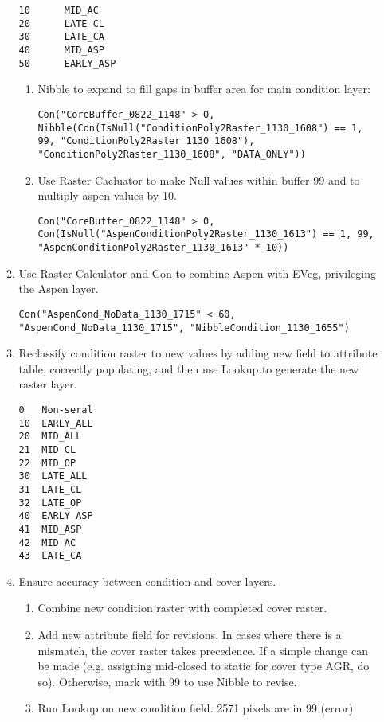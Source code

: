 \begin{enumerate}
\begin{enumerate}
\begin{verbatim}
10      MID_AC
20      LATE_CL
30      LATE_CA
40      MID_ASP
50      EARLY_ASP
        \end{verbatim}
        \begin{enumerate}
            \item Nibble to expand to fill gaps in buffer area for main condition layer:
            \begin{lstlisting}
Con("CoreBuffer_0822_1148" > 0, Nibble(Con(IsNull("ConditionPoly2Raster_1130_1608") == 1, 99, "ConditionPoly2Raster_1130_1608"), "ConditionPoly2Raster_1130_1608", "DATA_ONLY")) \end{lstlisting}
            \item Use Raster Cacluator to make Null values within buffer 99 and to multiply aspen values by 10. \begin{lstlisting}
Con("CoreBuffer_0822_1148" > 0, Con(IsNull("AspenConditionPoly2Raster_1130_1613") == 1, 99, "AspenConditionPoly2Raster_1130_1613" * 10))
            \end{lstlisting}
        \end{enumerate}
        \item Use Raster Calculator and Con to combine Aspen with EVeg, privileging the Aspen layer. \begin{lstlisting}
Con("AspenCond_NoData_1130_1715" < 60, "AspenCond_NoData_1130_1715", "NibbleCondition_1130_1655") \end{lstlisting}
        \item Reclassify condition raster to new values by adding new field to attribute table, correctly populating, and then use Lookup to generate the new raster layer.
        \begin{verbatim}
0   Non-seral
10  EARLY_ALL
20  MID_ALL
21  MID_CL
22  MID_OP
30  LATE_ALL
31  LATE_CL
32  LATE_OP
40  EARLY_ASP
41  MID_ASP
42  MID_AC
43  LATE_CA
\end{verbatim}  
        \item Ensure accuracy between condition and cover layers.
        \begin{enumerate}
            \item Combine new condition raster with completed cover raster.     
            \item Add new attribute field for revisions. In cases where there is a mismatch, the cover raster takes precedence. If a simple change can be made (e.g. assigning mid-closed to static for cover type AGR, do so). Otherwise, mark with 99 to use Nibble to revise.
            \item Run Lookup on new condition field. 2571 pixels are in 99 (error)

\end{enumerate}
\end{enumerate}
\end{enumerate}
